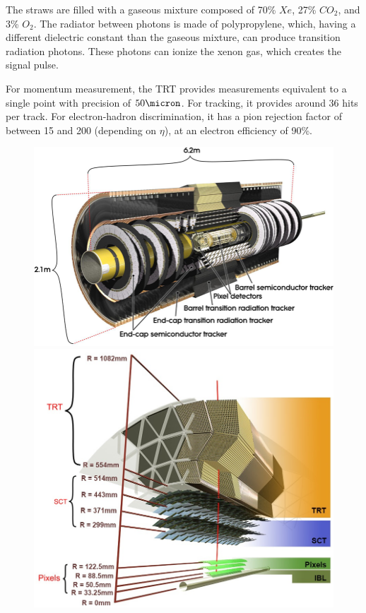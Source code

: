 The straws are filled with a gaseous mixture composed of 70\% $Xe$, 27\% $CO_2$, and 3\% $O_2$. The radiator between photons is made of polypropylene, which, having a different dielectric constant than the gaseous mixture, can produce transition radiation photons. These photons can ionize the xenon gas, which creates the signal pulse.


For momentum measurement, the \gls{TRT} provides measurements equivalent to a single point with precision of $\unit{50}{\micron}$. For tracking, it provides around 36 hits per track. For electron-hadron discrimination, it has a pion rejection factor of between 15 and 200 (depending on $\eta$), at an electron efficiency of 90\%.


\begin{figure}[!thp]
    \begin{minipage}[c]{.53\textwidth}
        \includegraphics[width=\textwidth]{chapters/chapter2_experiment/images/id_slice.png}
    \end{minipage}
    \begin{minipage}[c]{.45\textwidth}
        \includegraphics[width=\textwidth]{chapters/chapter2_experiment/images/id_layer.png} 

\end{minipage}
\end{figure}
